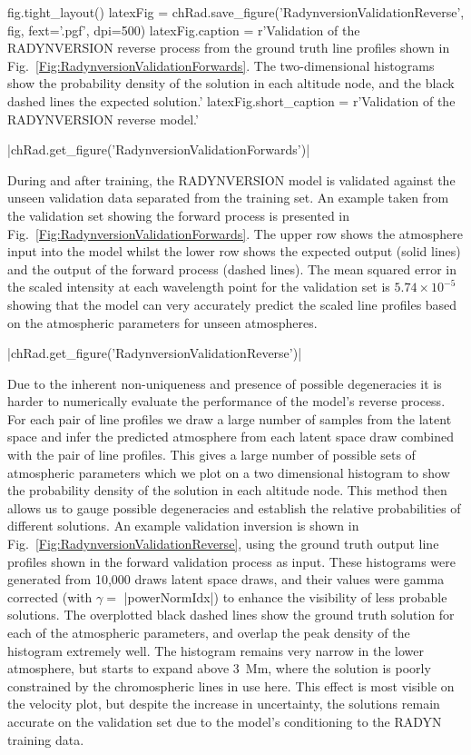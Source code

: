 \begin{pycode}[Radynversion]
fig.tight_layout()
latexFig = chRad.save_figure('RadynversionValidationReverse', fig, fext='.pgf', dpi=500)
latexFig.caption = r'Validation of the RADYNVERSION reverse process from the ground truth line profiles shown in Fig.~\ref{Fig:RadynversionValidationForwards}. The two-dimensional histograms show the probability density of the solution in each altitude node, and the black dashed lines the expected solution.'
latexFig.short_caption = r'Validation of the RADYNVERSION reverse model.'
\end{pycode}

\py[Radynversion]|chRad.get_figure('RadynversionValidationForwards')|

During and after training, the RADYNVERSION model is validated against the unseen validation data separated from the training set.
An example taken from the validation set showing the forward process is presented in Fig.~\ref{Fig:RadynversionValidationForwards}.
The upper row shows the atmosphere input into the model whilst the lower row shows the expected output (solid lines) and the output of the forward process (dashed lines).
The mean squared error in the scaled intensity at each wavelength point for the validation set is $5.74\times10^{-5}$ showing that the model can very accurately predict the scaled line profiles based on the atmospheric parameters for unseen atmospheres.

\py[Radynversion]|chRad.get_figure('RadynversionValidationReverse')|

Due to the inherent non-uniqueness and presence of possible degeneracies it is harder to numerically evaluate the performance of the model's reverse process.
For each pair of line profiles we draw a large number of samples from the latent space and infer the predicted atmosphere from each latent space draw combined with the pair of line profiles.
This gives a large number of possible sets of atmospheric parameters which we plot on a two dimensional histogram to show the probability density of the solution in each altitude node.
This method then allows us to gauge possible degeneracies and establish the relative probabilities of different solutions.
An example validation inversion is shown in Fig.~\ref{Fig:RadynversionValidationReverse}, using the ground truth output line profiles shown in the forward validation process as input.
These histograms were generated from 10,000 draws latent space draws, and their values were gamma corrected (with $\gamma=$ \py[Radynversion]|powerNormIdx|) to enhance the visibility of less probable solutions.
The overplotted black dashed lines show the ground truth solution for each of the atmospheric parameters, and overlap the peak density of the histogram extremely well.
The histogram remains very narrow in the lower atmosphere, but starts to expand above \SI{3}{\mega\metre}, where the solution is poorly constrained by the chromospheric lines in use here.
This effect is most visible on the velocity plot, but despite the increase in uncertainty, the solutions remain accurate on the validation set due to the model's conditioning to the RADYN training data.

